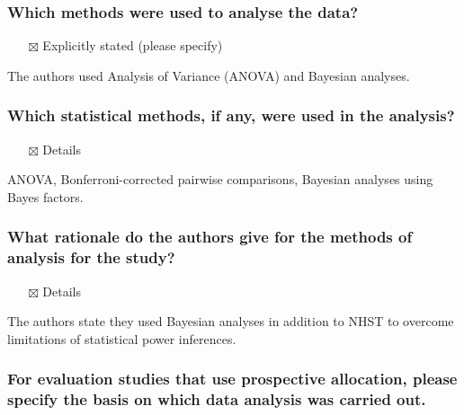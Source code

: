 \documentclass[
  doc, a4paper]{apa7}
\providecommand{\tightlist}{%
  \setlength{\itemsep}{0pt}\setlength{\parskip}{0pt}}
\begin{document}
\subsubsection{Which methods were used to analyse the data?}\label{which-methods-were-used-to-analyse-the-data}

\begin{itemize}
\tightlist
\item[$\boxtimes$]
  Explicitly stated (please specify)
\end{itemize}

The authors used Analysis of Variance (ANOVA) and Bayesian analyses.

\subsubsection{Which statistical methods, if any, were used in the analysis?}\label{which-statistical-methods-if-any-were-used-in-the-analysis}

\begin{itemize}
\tightlist
\item[$\boxtimes$]
  Details
\end{itemize}

ANOVA, Bonferroni-corrected pairwise comparisons, Bayesian analyses using Bayes factors.

\subsubsection{What rationale do the authors give for the methods of analysis for the study?}\label{what-rationale-do-the-authors-give-for-the-methods-of-analysis-for-the-study}

\begin{itemize}
\tightlist
\item[$\boxtimes$]
  Details
\end{itemize}

The authors state they used Bayesian analyses in addition to NHST to overcome limitations of statistical power inferences.

\subsubsection{For evaluation studies that use prospective allocation, please specify the basis on which data analysis was carried out.}\label{for-evaluation-studies-that-use-prospective-allocation-please-specify-the-basis-on-which-data-analysis-was-carried-out.}
\end{document}
